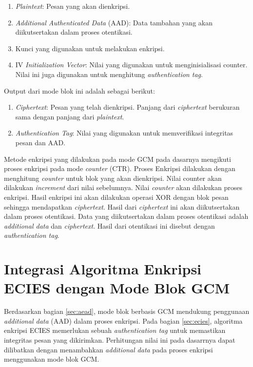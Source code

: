 \documentclass[conference]{IEEEtran}
\begin{document}
\begin{enumerate}
    \item \emph{Plaintext}: Pesan yang akan dienkripsi.
    \item \emph{Additional Authenticated Data} (AAD): Data tambahan yang akan diikutsertakan dalam proses otentikasi.
    \item Kunci yang digunakan untuk melakukan enkripsi.
    \item IV \emph{Initialization Vector}: Nilai yang digunakan untuk menginisialisasi counter. Nilai ini juga digunakan untuk menghitung \emph{authentication tag}.
\end{enumerate}

Output dari mode blok ini adalah sebagai berikut:

\begin{enumerate}
    \item \emph{Ciphertext}: Pesan yang telah dienkripsi. Panjang dari \emph{ciphertext} berukuran sama dengan panjang dari \emph{plaintext}.
    \item \emph{Authentication Tag}: Nilai yang digunakan untuk memverifikasi integritas pesan dan AAD.
\end{enumerate}

Metode enkripsi yang dilakukan pada mode GCM pada dasarnya mengikuti proses enkripsi pada mode \emph{counter} (CTR). Proses Enkripsi dilakukan dengan menghitung \emph{counter} untuk blok yang akan dienkripsi. Nilai counter akan dilakukan \emph{increment} dari nilai sebelumnya. Nilai \emph{counter} akan dilakukan proses enkripsi. Hasil enkripsi ini akan dilakukan operasi XOR dengan blok pesan sehingga mendapatkan \emph{ciphertext}. Hasil dari \emph{ciphertext} ini akan diikutsertakan dalam proses otentikasi. Data yang diikutsertakan dalam proses otentikasi adalah \emph{additional data} dan \emph{ciphertext}. Hasil dari otentikasi ini disebut dengan \emph{authentication tag}.

\section{Integrasi Algoritma Enkripsi ECIES dengan Mode Blok GCM}

Berdasarkan bagian \ref{sec:aead}, mode blok berbasis GCM mendukung penggunaan \emph{additional data} (AAD) dalam proses enkripsi. Pada bagian \ref{sec:ecies}, algoritma enkripsi ECIES memerlukan sebuah \emph{authentication tag} untuk memastikan integritas pesan yang dikirimkan. Perhitungan nilai ini pada dasarrnya dapat dilibatkan dengan menambahkan \emph{additional data} pada proses enkripsi menggunakan mode blok GCM. 
\end{document}
